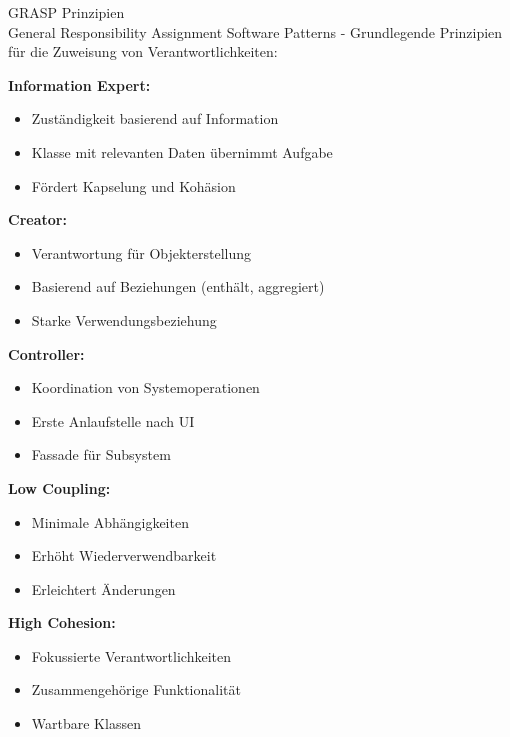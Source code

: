 \begin{concept}{GRASP Prinzipien}\\
General Responsibility Assignment Software Patterns - Grundlegende Prinzipien für die Zuweisung von Verantwortlichkeiten:

\textbf{Information Expert:}
\begin{itemize}
    \item Zuständigkeit basierend auf Information
    \item Klasse mit relevanten Daten übernimmt Aufgabe
    \item Fördert Kapselung und Kohäsion
\end{itemize}

\textbf{Creator:}
\begin{itemize}
    \item Verantwortung für Objekterstellung
    \item Basierend auf Beziehungen (enthält, aggregiert)
    \item Starke Verwendungsbeziehung
\end{itemize}

\textbf{Controller:}
\begin{itemize}
    \item Koordination von Systemoperationen
    \item Erste Anlaufstelle nach UI
    \item Fassade für Subsystem
\end{itemize}

\textbf{Low Coupling:}
\begin{itemize}
    \item Minimale Abhängigkeiten
    \item Erhöht Wiederverwendbarkeit
    \item Erleichtert Änderungen
\end{itemize}

\textbf{High Cohesion:}
\begin{itemize}
    \item Fokussierte Verantwortlichkeiten
    \item Zusammengehörige Funktionalität
    \item Wartbare Klassen
\end{itemize}
\end{concept}

